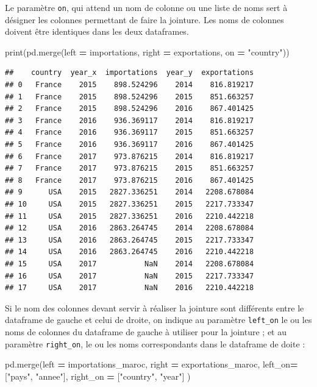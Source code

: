\documentclass[
  12pt,
]{book}
\newenvironment{Shaded}{\begin{snugshade}}{\end{snugshade}}
\newcommand{\BuiltInTok}[1]{#1}
\newcommand{\NormalTok}[1]{#1}
\newcommand{\OperatorTok}[1]{\textcolor[rgb]{0.81,0.36,0.00}{\textbf{#1}}}
\newcommand{\StringTok}[1]{\textcolor[rgb]{0.31,0.60,0.02}{#1}}
\numberwithin{equation}{section}
\numberwithin{countremarque}{section}
\begin{document}
Le paramètre \texttt{on}, qui attend un nom de colonne ou une liste de noms sert à désigner les colonnes permettant de faire la jointure. Les noms de colonnes doivent être identiques dans les deux dataframes.

\begin{Shaded}
\begin{Highlighting}[]
\BuiltInTok{print}\NormalTok{(pd.merge(left }\OperatorTok{=}\NormalTok{ importations, right }\OperatorTok{=}\NormalTok{ exportations, on }\OperatorTok{=} \StringTok{"country"}\NormalTok{))}
\end{Highlighting}
\end{Shaded}

\begin{lstlisting}
##    country  year_x  importations  year_y  exportations
## 0   France    2015    898.524296    2014    816.819217
## 1   France    2015    898.524296    2015    851.663257
## 2   France    2015    898.524296    2016    867.401425
## 3   France    2016    936.369117    2014    816.819217
## 4   France    2016    936.369117    2015    851.663257
## 5   France    2016    936.369117    2016    867.401425
## 6   France    2017    973.876215    2014    816.819217
## 7   France    2017    973.876215    2015    851.663257
## 8   France    2017    973.876215    2016    867.401425
## 9      USA    2015   2827.336251    2014   2208.678084
## 10     USA    2015   2827.336251    2015   2217.733347
## 11     USA    2015   2827.336251    2016   2210.442218
## 12     USA    2016   2863.264745    2014   2208.678084
## 13     USA    2016   2863.264745    2015   2217.733347
## 14     USA    2016   2863.264745    2016   2210.442218
## 15     USA    2017           NaN    2014   2208.678084
## 16     USA    2017           NaN    2015   2217.733347
## 17     USA    2017           NaN    2016   2210.442218
\end{lstlisting}

Si le nom des colonnes devant servir à réaliser la jointure sont différents entre le dataframe de gauche et celui de droite, on indique au paramètre \texttt{left\_on} le ou les noms de colonnes du dataframe de gauche à utiliser pour la jointure ; et au paramètre \texttt{right\_on}, le ou les noms correspondants dans le dataframe de doite :

\begin{Shaded}
\begin{Highlighting}[]
\NormalTok{pd.merge(left }\OperatorTok{=}\NormalTok{ importations\_maroc, right }\OperatorTok{=}\NormalTok{ exportations\_maroc,}
\NormalTok{         left\_on}\OperatorTok{=}\NormalTok{ [}\StringTok{"pays"}\NormalTok{, }\StringTok{"annee"}\NormalTok{], right\_on }\OperatorTok{=}\NormalTok{ [}\StringTok{"country"}\NormalTok{, }\StringTok{"year"}\NormalTok{] )}
\end{Highlighting}
\end{Shaded}
\end{document}
